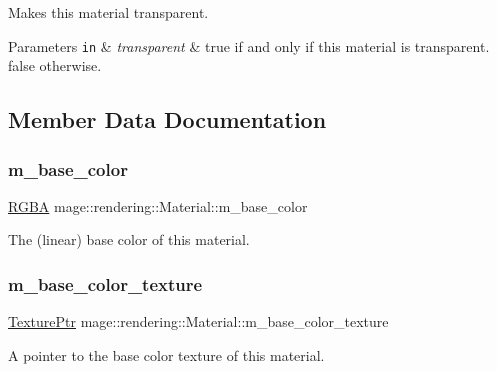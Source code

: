 Makes this material transparent.


\begin{DoxyParams}[1]{Parameters}
\mbox{\tt in}  & {\em transparent} & {\ttfamily true} if and only if this material is transparent. {\ttfamily false} otherwise. \\
\hline
\end{DoxyParams}


\subsection{Member Data Documentation}
\hypertarget{classmage_1_1rendering_1_1_material_aab907c723f66f06c8512014e7e217778}{}\label{classmage_1_1rendering_1_1_material_aab907c723f66f06c8512014e7e217778} 
\subsubsection{\texorpdfstring{m\+\_\+base\+\_\+color}{m\_base\_color}}
{\footnotesize\ttfamily \hyperlink{structmage_1_1_r_g_b_a}{R\+G\+BA} mage\+::rendering\+::\+Material\+::m\+\_\+base\+\_\+color\hspace{0.3cm}{\ttfamily [private]}}

The (linear) base color of this material. \hypertarget{classmage_1_1rendering_1_1_material_aaee7a296b1f966a1544a07d21e13b8f6}{}\label{classmage_1_1rendering_1_1_material_aaee7a296b1f966a1544a07d21e13b8f6} 
\subsubsection{\texorpdfstring{m\+\_\+base\+\_\+color\+\_\+texture}{m\_base\_color\_texture}}
{\footnotesize\ttfamily \hyperlink{namespacemage_1_1rendering_a6f3ae54f825328465b0cdde0f0de4a36}{Texture\+Ptr} mage\+::rendering\+::\+Material\+::m\+\_\+base\+\_\+color\+\_\+texture\hspace{0.3cm}{\ttfamily [private]}}

A pointer to the base color texture of this material. \hypertarget{classmage_1_1rendering_1_1_material_a4292698d8326e4f28dc45d59e00296dd}{}\label{classmage_1_1rendering_1_1_material_a4292698d8326e4f28dc45d59e00296dd} 
